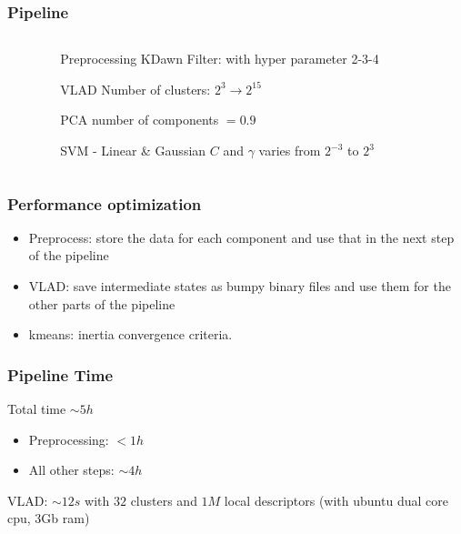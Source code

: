 \documentclass{beamer}
\begin{document}
\begin{frame}


\frametitle{Pipeline}
\begin{columns}[T]
\begin{column}{.1\textwidth}

\end{column}
\begin{column}{.8\textwidth}
\begin{block}{Preprocessing}
KDawn Filter: with hyper parameter 2-3-4 
\end{block}

\begin{block}{VLAD}
Number of clusters: $2^3\rightarrow 2^{15}$ 
\end{block}

\begin{block}{PCA}
number of components $=0.9$
\end{block}

\begin{block}{SVM - Linear \& Gaussian}
$C$ and $\gamma$ varies from $2^{-3}$ to $ 2^{3}$ 
\end{block}
\end{column} 
\begin{column}{.1\textwidth}

\end{column}
\end{columns}
\end{frame}


\begin{frame}
\frametitle{Performance optimization}
\begin{itemize}
\item Preprocess:  store the data for each component and use that in the next step of the pipeline
\item VLAD: save intermediate states as bumpy binary files and use them for the other parts of the pipeline
\item kmeans: inertia convergence criteria. 
\end{itemize} 
\end{frame}



\begin{frame}
\frametitle{Pipeline Time}
Total time $ \sim   5h$ 
\begin{itemize}
\item Preprocessing: $< 1h$
\item All other steps:  $\sim4h$ 
\end{itemize}
VLAD:  $ \sim   12s$ with $32$ clusters and $1M$ local descriptors (with ubuntu dual core cpu, 3Gb ram)
\end{frame}
\end{document}
